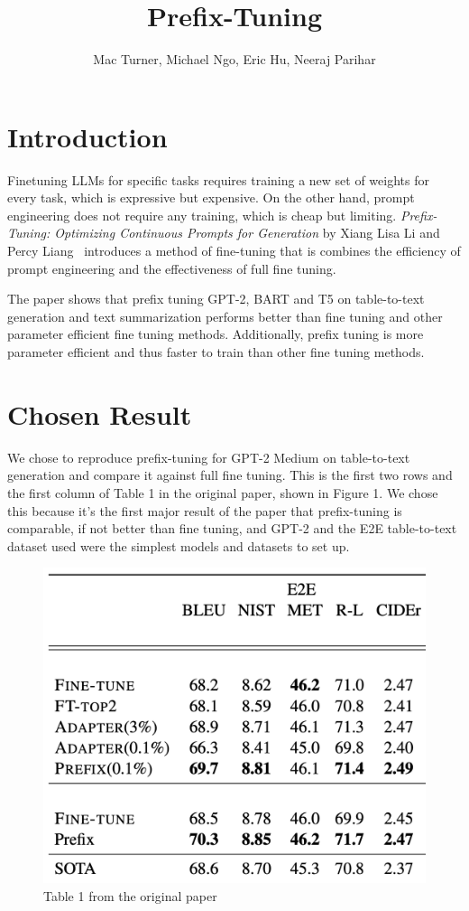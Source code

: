 \documentclass[11pt]{article} %
\title{Prefix-Tuning}
\author{Mac Turner, Michael Ngo, Eric Hu, Neeraj Parihar}
\begin{document}
\maketitle

\section{Introduction}
Finetuning LLMs for specific tasks requires training a new set of weights for every task, which is expressive but expensive. On the other hand, prompt engineering does not require any training, which is cheap but limiting. \textit{Prefix-Tuning: Optimizing Continuous Prompts for Generation} by Xiang Lisa Li and Percy Liang~\cite{li-liang-2021-prefix} introduces a method of fine-tuning that is combines the efficiency of prompt engineering and the effectiveness of full fine tuning.

The paper shows that prefix tuning GPT-2, BART and T5 on table-to-text generation and text summarization performs better than fine tuning and other parameter efficient fine tuning methods. Additionally, prefix tuning is more parameter efficient and thus faster to train than other fine tuning methods.

\section{Chosen Result}

We chose to reproduce prefix-tuning for GPT-2 Medium on table-to-text generation and compare it against full fine tuning. This is the first two rows and the first column of Table 1 in the original paper, shown in Figure 1. We chose this because it's the first major result of the paper that prefix-tuning is comparable, if not better than fine tuning, and GPT-2 and the E2E table-to-text dataset used were the simplest models and datasets to set up.

\begin{figure}
    \centering
    \includegraphics[width=0.5\linewidth]{table1.png}
    \caption{Table 1 from the original paper}
    \label{fig:enter-label}
\end{figure}
\end{document}
